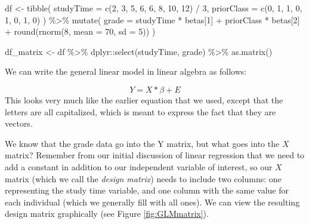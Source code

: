 \documentclass[
  12pt,
]{book}
\newenvironment{Shaded}{\begin{snugshade}}{\end{snugshade}}
\newcommand{\AttributeTok}[1]{\textcolor[rgb]{0.77,0.63,0.00}{#1}}
\newcommand{\DecValTok}[1]{\textcolor[rgb]{0.00,0.00,0.81}{#1}}
\newcommand{\FunctionTok}[1]{\textcolor[rgb]{0.00,0.00,0.00}{#1}}
\newcommand{\NormalTok}[1]{#1}
\newcommand{\OtherTok}[1]{\textcolor[rgb]{0.56,0.35,0.01}{#1}}
\newcommand{\SpecialCharTok}[1]{\textcolor[rgb]{0.00,0.00,0.00}{#1}}
\begin{document}
\begin{Shaded}
\begin{Highlighting}[]
\NormalTok{df }\OtherTok{\textless{}{-}}
  \FunctionTok{tibble}\NormalTok{(}
    \AttributeTok{studyTime =} \FunctionTok{c}\NormalTok{(}\DecValTok{2}\NormalTok{, }\DecValTok{3}\NormalTok{, }\DecValTok{5}\NormalTok{, }\DecValTok{6}\NormalTok{, }\DecValTok{6}\NormalTok{, }\DecValTok{8}\NormalTok{, }\DecValTok{10}\NormalTok{, }\DecValTok{12}\NormalTok{) }\SpecialCharTok{/} \DecValTok{3}\NormalTok{,}
    \AttributeTok{priorClass =} \FunctionTok{c}\NormalTok{(}\DecValTok{0}\NormalTok{, }\DecValTok{1}\NormalTok{, }\DecValTok{1}\NormalTok{, }\DecValTok{0}\NormalTok{, }\DecValTok{1}\NormalTok{, }\DecValTok{0}\NormalTok{, }\DecValTok{1}\NormalTok{, }\DecValTok{0}\NormalTok{)}
\NormalTok{  ) }\SpecialCharTok{\%\textgreater{}\%}
  \FunctionTok{mutate}\NormalTok{(}
    \AttributeTok{grade =} 
\NormalTok{      studyTime }\SpecialCharTok{*}\NormalTok{ betas[}\DecValTok{1}\NormalTok{] }\SpecialCharTok{+} 
\NormalTok{      priorClass }\SpecialCharTok{*}\NormalTok{ betas[}\DecValTok{2}\NormalTok{] }\SpecialCharTok{+} 
      \FunctionTok{round}\NormalTok{(}\FunctionTok{rnorm}\NormalTok{(}\DecValTok{8}\NormalTok{, }\AttributeTok{mean =} \DecValTok{70}\NormalTok{, }\AttributeTok{sd =} \DecValTok{5}\NormalTok{))}
\NormalTok{  )}

\NormalTok{df\_matrix }\OtherTok{\textless{}{-}} 
\NormalTok{  df }\SpecialCharTok{\%\textgreater{}\%}
\NormalTok{  dplyr}\SpecialCharTok{::}\FunctionTok{select}\NormalTok{(studyTime, grade) }\SpecialCharTok{\%\textgreater{}\%}
  \FunctionTok{as.matrix}\NormalTok{()}
\end{Highlighting}
\end{Shaded}

We can write the general linear model in linear algebra as follows:

\[
Y = X*\beta + E
\]
This looks very much like the earlier equation that we used, except that the letters are all capitalized, which is meant to express the fact that they are vectors.

We know that the grade data go into the Y matrix, but what goes into the \(X\) matrix? Remember from our initial discussion of linear regression that we need to add a constant in addition to our independent variable of interest, so our \(X\) matrix (which we call the \emph{design matrix}) needs to include two columns: one representing the study time variable, and one column with the same value for each individual (which we generally fill with all ones). We can view the resulting design matrix graphically (see Figure \ref{fig:GLMmatrix}).
\end{document}
